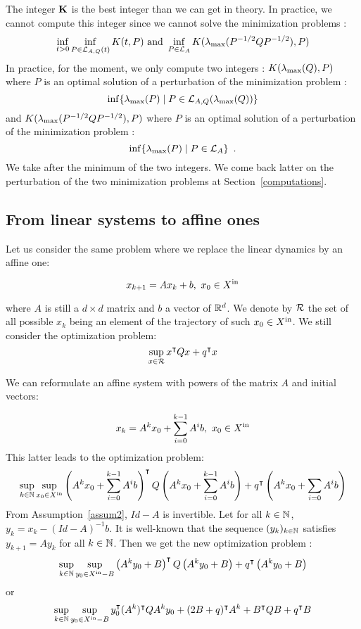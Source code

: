 \documentclass[10pt]{article}
\begin{document}
The integer $\mathbf{K}$ is the best integer than we can get in theory. In practice, we cannot compute this integer since we cannot solve the minimization problems :
\[
\inf_{t>0}\inf_{P\in\mathcal{L}_{A,Q}(t)} K(t,P)\text{ and }\inf_{P\in\mathcal{L}_{A}}K(\lambda_{\operatorname{max}}(P^{-1/2} Q P^{-1/2}),P)
\]
In practice, for the moment, we only compute two integers : $K( \lambda_{\operatorname{max}}(Q),P)$ where $P$ is an optimal solution of a perturbation of the minimization problem : 
\begin{equation}
\label{minlmaxQ}
\inf\{\lambda_{\operatorname{max}}(P)\mid P\in \mathcal{L}_{A,Q}(\lambda_{\operatorname{max}}(Q))\}
\end{equation}
and $K(\lambda_{\operatorname{max}}(P^{-1/2} Q P^{-1/2}),P)$ where $P$ is an optimal solution of a perturbation of the minimization problem :
\begin{equation}
\label{minlyap}
\inf\{\lambda_{\operatorname{max}}(P)\mid P\in\mathcal{L}_{A}\}\enspace .
\end{equation}
We take after the minimum of the  two integers. We come back latter on the perturbation of the two minimization problems at Section~\ref{computations}.
\subsection{From linear systems to affine ones}
\label{affine}
Let us consider the same problem where we replace the linear dynamics by an affine one:

\[
x_{k+1}=A x_k+b,\ x_0\in X^\mathrm{in}
\]

where $A$ is still a $d\times d$ matrix and $b$ a vector of $\mathbb R^d$. We denote by $\mathcal{R}$ the set of all possible $x_k$ being an element of the trajectory of such $x_0\in X^\mathrm{in}$. We still consider the optimization problem:
\[
\sup_{x\in\mathcal{R}} x^\intercal Q x+q^\intercal x
\]

We can reformulate an affine system with powers of the matrix $A$ and initial vectors: 

\[
x_{k}=A^k x_0+\sum_{i=0}^{k-1} A^i b,\ x_0\in \xin
\]
This latter leads to the optimization problem:
\[
\sup_{k\in\mathbb{N}} \sup_{x_0\in X^\mathrm{in}} \left(A^k x_0+\sum_{i=0}^{k-1} A^i b\right)^\intercal Q  \left(A^k x_0+\sum_{i=0}^{k-1} A^i b\right)+q^\intercal  \left(A^k x_0+\sum_{i=0} A^i b\right)
\]
From Assumption~\ref{assum2}, $Id-A$ is invertible. Let for all $k\in\mathbb{N}$, $y_k=x_k-(Id-A)^{-1} b$. It is well-known that the sequence $(y_k)_{k\in\mathbb{N}}$ satisfies $y_{k+1}=A y_k$ for all $k\in\mathbb{N}$. Then we get the new optimization problem : 
\[
\sup_{k\in\mathbb{N}} \sup_{y_0\in X^\mathrm{in}-B} \left(A^k y_0+B\right)^\intercal Q  \left(A^k y_0+B\right)+q^\intercal  \left(A^k y_0+B\right)
\]
or
\[
\sup_{k\in\mathbb{N}} \sup_{y_0\in X^\mathrm{in}-B} y_0^\intercal (A^k)^\intercal Q  A^k y_0+(2B+q)^\intercal A^k +B^\intercal Q B+q^\intercal B
\]
\end{document}
